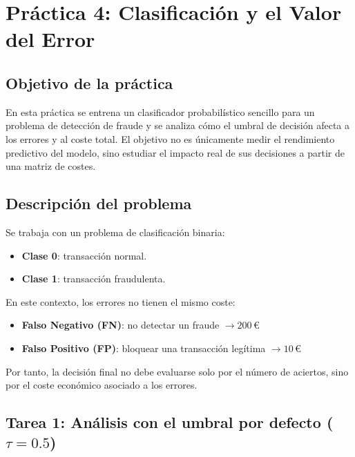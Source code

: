 
\section{Práctica 4: Clasificación y el Valor del Error}

\subsection{Objetivo de la práctica}
En esta práctica se entrena un clasificador probabilístico sencillo para un problema de detección de fraude y se analiza cómo el umbral de decisión afecta a los errores y al coste total. El objetivo no es únicamente medir el rendimiento predictivo del modelo, sino estudiar el impacto real de sus decisiones a partir de una matriz de costes.

\subsection{Descripción del problema}
Se trabaja con un problema de clasificación binaria:
\begin{itemize}
  \item \textbf{Clase 0}: transacción normal.
  \item \textbf{Clase 1}: transacción fraudulenta.
\end{itemize}

En este contexto, los errores no tienen el mismo coste:
\begin{itemize}
  \item \textbf{Falso Negativo (FN)}: no detectar un fraude \(\rightarrow 200\,€\)
  \item \textbf{Falso Positivo (FP)}: bloquear una transacción legítima \(\rightarrow 10\,€\)
\end{itemize}

Por tanto, la decisión final no debe evaluarse solo por el número de aciertos, sino por el coste económico asociado a los errores.

\subsection{Tarea 1: Análisis con el umbral por defecto (\(\tau = 0.5\))}

